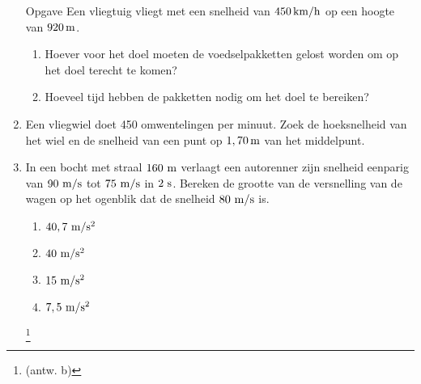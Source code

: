 \begin{enumerate}
\item[Opgave] Een vliegtuig vliegt met een snelheid van $450\rm\,km/h$ op een hoogte van $920\rm\,m$.
\begin{enumerate}
\item Hoever voor het doel moeten de voedselpakketten gelost worden om op het doel terecht te komen?
\item Hoeveel tijd hebben de pakketten nodig om het doel te bereiken?
\end{enumerate}









\item Een vliegwiel doet 450 omwentelingen per minuut. Zoek de hoeksnelheid van het wiel en de snelheid van een punt op $1,70\rm\,m$ van het middelpunt.

\item In een bocht met straal $160~\rm m$ verlaagt een autorenner
zijn snelheid eenparig van $90~\rm m/s$ tot $75~\rm m/s$ in $2~\rm
s$. Bereken de grootte van de versnelling van de wagen op het
ogenblik dat de snelheid $80~\rm m/s$ is.
\begin{enumerate}
\item $40,7~\rm m/s^2$
\item $40~\rm m/s^2$
\item $15~\rm m/s^2$
\item $7,5~\rm m/s^2$
\end{enumerate}
\footnote{(antw. b)}


\end{enumerate}
